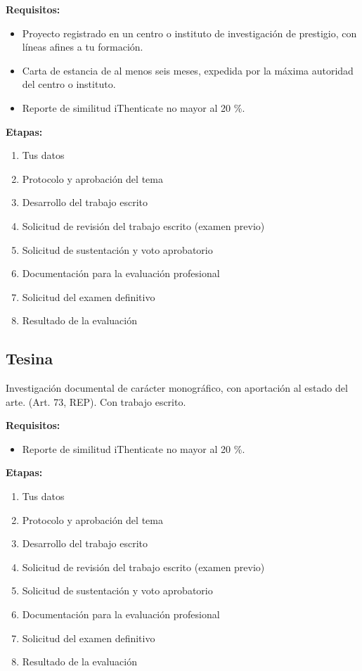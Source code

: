 \textbf{Requisitos:}
\begin{itemize}
  \item Proyecto registrado en un centro o instituto de investigación de prestigio, con líneas afines a tu formación.
  \item Carta de estancia de al menos seis meses, expedida por la máxima autoridad del centro o instituto.
  \item Reporte de similitud iThenticate no mayor al 20 \%.
\end{itemize}
\textbf{Etapas:}
\begin{enumerate}
  \item Tus datos
  \item Protocolo y aprobación del tema
  \item Desarrollo del trabajo escrito
  \item Solicitud de revisión del trabajo escrito (examen previo)
  \item Solicitud de sustentación y voto aprobatorio
  \item Documentación para la evaluación profesional
  \item Solicitud del examen definitivo
  \item Resultado de la evaluación
\end{enumerate}
\subsection{Tesina}
Investigación documental de carácter monográfico, con aportación al estado del arte. (Art. 73, REP). Con trabajo escrito.

\textbf{Requisitos:}
\begin{itemize}
  \item Reporte de similitud iThenticate no mayor al 20 \%.
\end{itemize}
\textbf{Etapas:}
\begin{enumerate}
  \item Tus datos
  \item Protocolo y aprobación del tema
  \item Desarrollo del trabajo escrito
  \item Solicitud de revisión del trabajo escrito (examen previo)
  \item Solicitud de sustentación y voto aprobatorio
  \item Documentación para la evaluación profesional
  \item Solicitud del examen definitivo
  \item Resultado de la evaluación
\end{enumerate}
